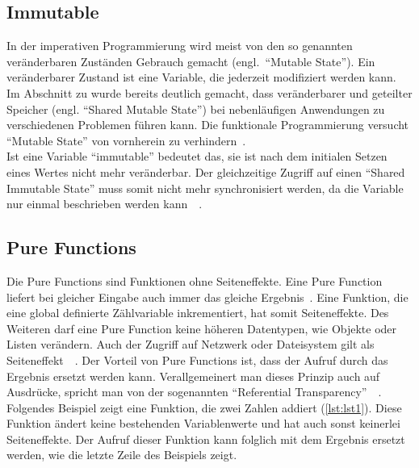 \subsection{Immutable}
In der imperativen Programmierung wird meist von den so genannten veränderbaren Zuständen Gebrauch gemacht (engl.~\enquote{Mutable State}). Ein veränderbarer Zustand ist eine Variable, die jederzeit modifiziert werden kann. Im Abschnitt zu  wurde bereits deutlich gemacht, dass veränderbarer und geteilter Speicher (engl. \enquote{Shared Mutable State}) bei nebenläufigen Anwendungen zu verschiedenen Problemen führen kann. Die funktionale Programmierung versucht \enquote{Mutable State} von vornherein zu verhindern~\cite[S.~50]{butcher_seven_2014}.\\
Ist eine Variable \enquote{immutable} bedeutet das, sie ist nach dem initialen Setzen eines Wertes nicht mehr veränderbar. Der gleichzeitige Zugriff auf einen \enquote{Shared Immutable State} muss somit nicht mehr synchronisiert werden, da die Variable nur einmal beschrieben werden kann~\cite[S.~50]{butcher_seven_2014}~\cite[S.~62]{kuhn_reactive_2015}.\\

\pagebreak

\subsection{Pure Functions}
Die Pure Functions sind Funktionen ohne Seiteneffekte. Eine Pure Function liefert bei gleicher Eingabe auch immer das gleiche Ergebnis~\cite[S.~61]{kuhn_reactive_2015}. Eine Funktion, die eine global definierte Zählvariable inkrementiert, hat somit Seiteneffekte. Des Weiteren darf eine Pure Function keine höheren Datentypen, wie Objekte oder Listen verändern. Auch der Zugriff auf Netzwerk oder Dateisystem gilt als Seiteneffekt~\cite[S.~3]{chiusano_functional_2015}~\cite[S.~62]{kuhn_reactive_2015}.
Der Vorteil von Pure Functions ist, dass der Aufruf durch das Ergebnis ersetzt werden kann. Verallgemeinert man dieses Prinzip auch auf Ausdrücke, spricht man von der sogenannten \enquote{Referential Transparency}~\cite[S.~9]{chiusano_functional_2015}~\cite[S.~62]{kuhn_reactive_2015}. Folgendes Beispiel zeigt eine Funktion, die zwei Zahlen addiert (\ref{lst:lst1}). Diese Funktion ändert keine bestehenden Variablenwerte und hat auch sonst keinerlei Seiteneffekte. Der Aufruf dieser Funktion kann folglich mit dem Ergebnis ersetzt werden, wie die letzte Zeile des Beispiels zeigt.


